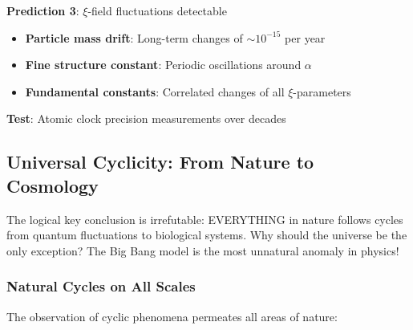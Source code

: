 \documentclass[12pt,a4paper]{article}
\theoremstyle{definition}
\begin{document}
	\begin{experiment}
		\textbf{Prediction 3}: $\xi$-field fluctuations detectable
		\begin{itemize}
			\item \textbf{Particle mass drift}: Long-term changes of $\sim 10^{-15}$ per year
			\item \textbf{Fine structure constant}: Periodic oscillations around $\alpha$
			\item \textbf{Fundamental constants}: Correlated changes of all $\xi$-parameters
		\end{itemize}
		\textbf{Test}: Atomic clock precision measurements over decades
	\end{experiment}
	
	\subsection{Universal Cyclicity: From Nature to Cosmology}
	
	\begin{revolutionary}
		The logical key conclusion is irrefutable: EVERYTHING in nature follows cycles from quantum fluctuations to biological systems. Why should the universe be the only exception? The Big Bang model is the most unnatural anomaly in physics!
	\end{revolutionary}
	
	\subsubsection{Natural Cycles on All Scales}
	
	The observation of cyclic phenomena permeates all areas of nature:
	
\end{document}
